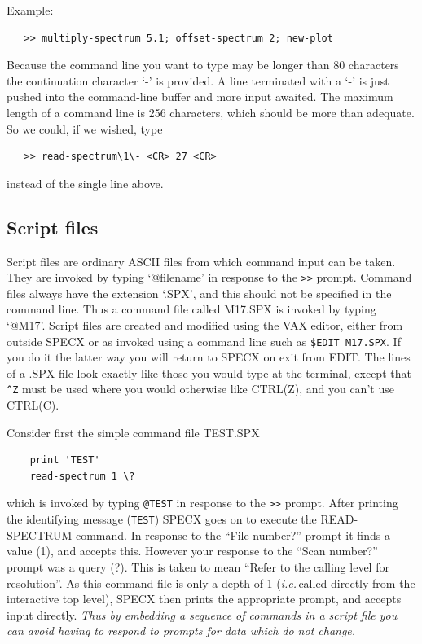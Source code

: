\documentclass[11pt,twoside]{report}
\newcommand{\ie}{{\it i.e.\,}}
\begin{document}
Example:
\begin{verbatim}
   >> multiply-spectrum 5.1; offset-spectrum 2; new-plot
\end{verbatim}

Because the command line you want to type may be longer than 80
characters the continuation
character `-' is provided. A line terminated with a `-' is just pushed
into the command-line buffer
and more input awaited. The maximum length of a command line is 256
characters, which should be more than adequate. So we could, if we
wished, type
\begin{verbatim}
   >> read-spectrum\1\- <CR> 27 <CR>
\end{verbatim}
instead of the single line above.

\subsection{Script files}

Script files are ordinary ASCII files from which command input can be
taken. They are invoked by typing `@filename' in response to the
\verb+>>+ prompt. Command files always have the extension
`.SPX', and this should not be specified in the
command line. Thus a command file called M17.SPX is invoked by typing
`@M17'.  Script files are created and modified using the VAX
editor, either from outside SPECX or as invoked
using a command line such as \verb+$EDIT M17.SPX+. If you do it the
latter way you will return to SPECX on exit from EDIT. The lines of a
.SPX file look exactly like those you would type at the terminal,
except that
\verb+^Z+  must be used where you would otherwise like CTRL(Z),
and you can't use CTRL(C).

Consider first the simple command file TEST.SPX
\begin{verbatim}
    print 'TEST'
    read-spectrum 1 \?
\end{verbatim}
which is invoked by typing \verb+@TEST+ in response to the \verb+>>+ prompt.
After printing the identifying message (\verb+TEST+) SPECX goes on to
execute the READ-SPECTRUM command. In response to the ``File number?''
prompt it finds a value (1), and accepts this. However your response to the
``Scan number?'' prompt was a query (?). This is taken to mean ``Refer to the
calling level for resolution''. As this command file is only a depth of
1 (\ie called directly from the interactive top level), SPECX then prints the
appropriate prompt, and accepts input directly. {\em Thus by embedding a sequence
of commands in a script file you can avoid having to respond to
prompts for data which do not change.}
\end{document}
